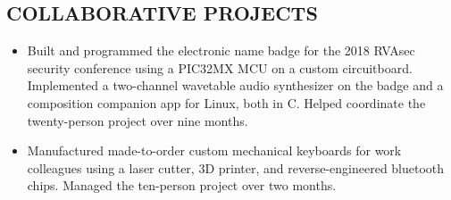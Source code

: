 \documentclass{res}     %
\newenvironment{itemizecols}{
    \begin{multicols}{3}\raggedright\begin{itemize}
}{
    \end{itemize}\end{multicols}
}
\begin{document}
\begin{resume}
\section{COLLABORATIVE PROJECTS}
\vspace{5mm}
\begin{itemize}[leftmargin=5mm]
\item Built and programmed the electronic name badge for the 2018 RVAsec security conference using a PIC32MX MCU on a custom circuitboard. Implemented a two-channel wavetable audio synthesizer on the badge and a composition companion app for Linux, both in C. Helped coordinate the twenty-person project over nine months.
\item Manufactured made-to-order custom mechanical keyboards for work colleagues using a laser cutter, 3D printer, and reverse-engineered bluetooth chips. Managed the ten-person project over two months.
\end{itemize}


\end{resume}
\end{document}

